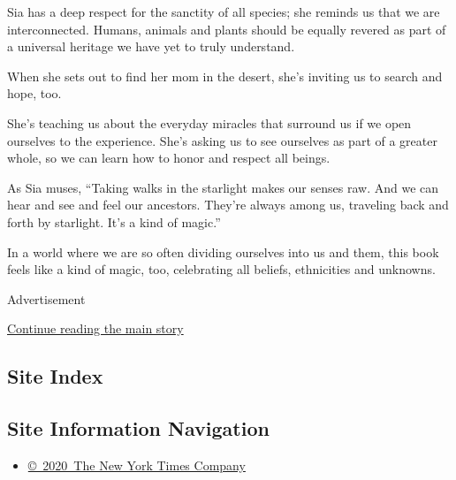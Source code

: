 Sia has a deep respect for the sanctity of all species; she reminds us
that we are interconnected. Humans, animals and plants should be equally
revered as part of a universal heritage we have yet to truly understand.

When she sets out to find her mom in the desert, she's inviting us to
search and hope, too.

She's teaching us about the everyday miracles that surround us if we
open ourselves to the experience. She's asking us to see ourselves as
part of a greater whole, so we can learn how to honor and respect all
beings.

As Sia muses, ``Taking walks in the starlight makes our senses raw. And
we can hear and see and feel our ancestors. They're always among us,
traveling back and forth by starlight. It's a kind of magic.''

In a world where we are so often dividing ourselves into us and them,
this book feels like a kind of magic, too, celebrating all beliefs,
ethnicities and unknowns.

Advertisement

\protect\hyperlink{after-bottom}{Continue reading the main story}

\hypertarget{site-index}{%
\subsection{Site Index}\label{site-index}}

\hypertarget{site-information-navigation}{%
\subsection{Site Information
Navigation}\label{site-information-navigation}}

\begin{itemize}
\tightlist
\item
  \href{https://help.nytimes3xbfgragh.onion/hc/en-us/articles/115014792127-Copyright-notice}{©~2020~The
  New York Times Company}
\end{itemize}

